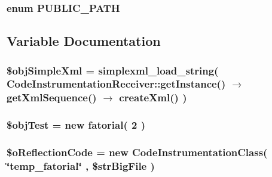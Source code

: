 \hypertarget{code_instrumentation_2example_2test1_8php_b72f88470e4eee5518bfc7c908101d80}{
\subsubsection[{PUBLIC\_\-PATH}]{\setlength{\rightskip}{0pt plus 5cm}enum {\bf PUBLIC\_\-PATH}}}
\label{code_instrumentation_2example_2test1_8php_b72f88470e4eee5518bfc7c908101d80}




\subsection{Variable Documentation}
\hypertarget{code_instrumentation_2example_2test1_8php_da23b058075209c6506f7b0b1bb0d5bf}{
\subsubsection[{\$objSimpleXml}]{\setlength{\rightskip}{0pt plus 5cm}\$objSimpleXml = simplexml\_\-load\_\-string( CodeInstrumentationReceiver::getInstance() $\rightarrow$ getXmlSequence() $\rightarrow$ createXml() )}}
\label{code_instrumentation_2example_2test1_8php_da23b058075209c6506f7b0b1bb0d5bf}


\hypertarget{code_instrumentation_2example_2test1_8php_e72f9ac2779bbc5e49a4a9df50c17c73}{
\subsubsection[{\$objTest}]{\setlength{\rightskip}{0pt plus 5cm}\$objTest = new fatorial( 2 )}}
\label{code_instrumentation_2example_2test1_8php_e72f9ac2779bbc5e49a4a9df50c17c73}


\hypertarget{code_instrumentation_2example_2test1_8php_dff853bfc3335950f89bfb9e1a779c7e}{
\subsubsection[{\$oReflectionCode}]{\setlength{\rightskip}{0pt plus 5cm}\$oReflectionCode = new CodeInstrumentationClass( \char`\"{}temp\_\-fatorial\char`\"{} , \$strBigFile )}}
\label{code_instrumentation_2example_2test1_8php_dff853bfc3335950f89bfb9e1a779c7e}


